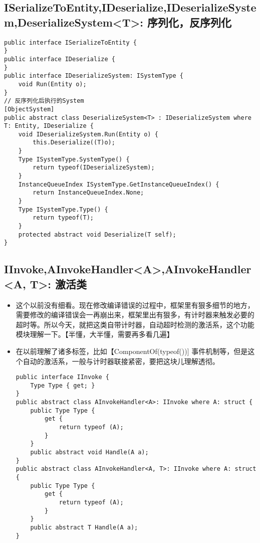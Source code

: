 \documentclass[9pt, b5paper]{article}
\begin{document}
\subsection{ISerializeToEntity,IDeserialize,IDeserializeSystem,DeserializeSystem<T>: 序列化，反序列化}
\label{sec-1-16}
\begin{verbatim}
public interface ISerializeToEntity {
}
public interface IDeserialize {
}
public interface IDeserializeSystem: ISystemType {
    void Run(Entity o);
}
// 反序列化后执行的System
[ObjectSystem]
public abstract class DeserializeSystem<T> : IDeserializeSystem where T: Entity, IDeserialize {
    void IDeserializeSystem.Run(Entity o) {
        this.Deserialize((T)o);
    }
    Type ISystemType.SystemType() {
        return typeof(IDeserializeSystem);
    }
    InstanceQueueIndex ISystemType.GetInstanceQueueIndex() {
        return InstanceQueueIndex.None;
    }
    Type ISystemType.Type() {
        return typeof(T);
    }
    protected abstract void Deserialize(T self);
}
\end{verbatim}
\subsection{IInvoke,AInvokeHandler<A>,AInvokeHandler<A, T>: 激活类}
\label{sec-1-17}
\begin{itemize}
\item 这个以前没有细看。现在修改编译错误的过程中，框架里有狠多细节的地方，需要修改的编译错误会一再崩出来，框架里出有狠多，有计时器来触发必要的超时等。所以今天，就把这类自带计时器，自动超时检测的激活系，这个功能模块理解一下。【半懂，大半懂，需要再多看几遍】
\item 在以前理解了诸多标签，比如【ComponentOf(typeof())] 事件机制等，但是这个自动的激活系，一般与计时器联接紧密，要把这块儿理解透彻。
\begin{verbatim}
public interface IInvoke {
    Type Type { get; }
}
public abstract class AInvokeHandler<A>: IInvoke where A: struct {
    public Type Type {
        get {
            return typeof (A);
        }
    }
    public abstract void Handle(A a);
}
public abstract class AInvokeHandler<A, T>: IInvoke where A: struct {
    public Type Type {
        get {
            return typeof (A);
        }
    }
    public abstract T Handle(A a);
}
\end{verbatim}
\end{itemize}
\end{document}
